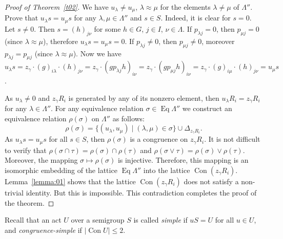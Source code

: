 \documentclass{birkau}
\numberwithin{equation}{section}
\theoremstyle{plain}
\theoremstyle{definition}
\DeclareMathOperator{\Con}{Con}
\DeclareMathOperator{\Eq}{Eq}
\begin{document}
\begin{proof}[Proof of Theorem~\ref{t02}]
        We have $u_\lambda \ne u_\mu$, $\lambda \approx \mu$ for the elements $\lambda \ne \mu$ of $\Lambda''$. Prove that $u_\lambda s=u_\mu s$ for any $\lambda, \mu \in \Lambda''$ and $s\in S$. Indeed, it is clear for $s=0$. Let $s\ne 0$. Then $s=(h)_{j\nu}$ for some $h\in G$, $j\in I$, $\nu \in \Lambda$. If $p_{\lambda j}=0$, then $p_{\mu j}=0$ (since $\lambda \approx \mu$), therefore $u_\lambda s=u_\mu s=0$. If $p_{\lambda j}\ne 0$, then $p_{\mu j} \ne 0$, moreover $p_{\lambda j}=p_{\mu j}$ (since $\lambda \approx \mu$). Now we have $u_\lambda s=z_\gamma\cdot (g)_{i\lambda} \cdot (h)_{j\nu} = z_\gamma\cdot (gp_{\lambda j}h)_{i\nu} = z_\gamma \cdot (gp_{\mu j}h)_{i\nu} = z_\gamma \cdot (g)_{i\mu} \cdot (h)_{j\nu} =u_\mu s$.

        As $u_\lambda \ne 0$ and $z_\gamma R_i$ is generated by any of its nonzero element, then $u_\lambda R_i = z_\gamma R_i$ for any $\lambda \in \Lambda''$. For any equivalence relation $\sigma \in \Eq \Lambda''$ we construct an equivalence relation $\rho(\sigma)$ on $\Lambda''$ as follows: $$ \rho(\sigma)=\{ (u_\lambda,u_\mu) \mid (\lambda,\mu)\in \sigma \} \cup \Delta_{z_\gamma R_i}.  $$ As $u_\lambda s=u_\mu s$ for all $s\in S$, then $\rho(\sigma)$ is a congruence on $z_\gamma R_i$. It is not difficult to verify that $\rho (\sigma \cap \tau) =\rho(\sigma) \cap \rho(\tau)$ and $\rho (\sigma \vee \tau) =\rho(\sigma) \vee \rho(\tau)$. Moreover, the mapping $\sigma \mapsto \rho(\sigma)$ is injective. Therefore, this mapping is an isomorphic embedding of the lattice $\Eq \Lambda''$ into the lattice $\Con (z_\gamma R_i)$.   Lemma~\ref{lemma:01} shows that the lattice $\Con (z_\gamma R_i)$ does not satisfy a non-trivial identity. But this is impossible. This contradiction completes the proof of the theorem.
	\end{proof}
	
	Recall that an act $U$ over a semigroup $S$ is called \textit{simple} if $uS = U$ for all $ u \in U$, and \textit{congruence-simple} if $|\Con U| \leqslant 2$.
	
\end{document}
